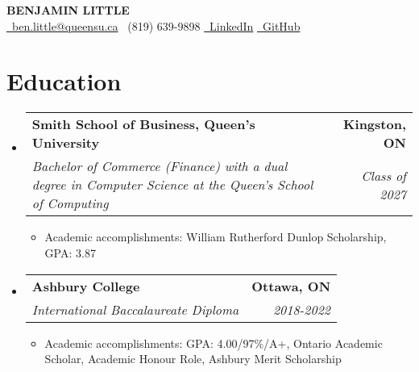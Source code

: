 \documentclass[letterpaper,10pt]{article}
\makeatletter
\newcommand{\resumeItem}[1]{
  \item\small{
    {#1 \vspace{-2pt}}
  }
}
\newcommand{\resumeSubheading}[4]{
  \vspace{-2pt}\item
    \begin{tabular*}{1.0\textwidth}[t]{l@{\extracolsep{\fill}}r}
      \textbf{#1} & \textbf{\small #2} \\
      \textit{\small#3} & \textit{\small #4} \\
    \end{tabular*}\vspace{-7pt}
}
\newcommand{\resumeSubHeadingListStart}{\begin{itemize}[leftmargin=0.0in, label={}]}
\newcommand{\resumeSubHeadingListEnd}{\end{itemize}}
\newcommand{\resumeItemListStart}{\begin{itemize}[label=--]}
\newcommand{\resumeItemListEnd}{\end{itemize}\vspace{-5pt}}
\makeatother
\begin{document}
\begin{center}
    \textbf{\Huge \scshape BENJAMIN LITTLE} \\ \vspace{3pt}
    \scriptsize \href{mailto:ben.little@queensu.ca}{\faEnvelope \ ben.little@queensu.ca} \textbar{} \faPhone \ (819) 639-9898 \textbar{} \href{https://www.linkedin.com/in/benjamin-little1}{\faLinkedin \ LinkedIn} \textbar{} \href{https://github.com/BenLittle1}{\faGithub \ GitHub}
\end{center}
\vspace{-15pt}

\section{Education}
  \resumeSubHeadingListStart
    \resumeSubheading
      {Smith School of Business, Queen's University}{Kingston, ON}
      {Bachelor of Commerce (Finance) with a dual degree in Computer Science at the Queen's School of Computing}{Class of 2027}
      \resumeItemListStart
        \resumeItem{Academic accomplishments: William Rutherford Dunlop Scholarship, GPA: 3.87}
      \resumeItemListEnd
    \resumeSubheading
      {Ashbury College}{Ottawa, ON}
      {International Baccalaureate Diploma}{2018-2022}
      \resumeItemListStart
        \resumeItem{Academic accomplishments: GPA: 4.00/97\%/A+, Ontario Academic Scholar, Academic Honour Role, Ashbury Merit Scholarship}
      \resumeItemListEnd
  \resumeSubHeadingListEnd

\end{document}
